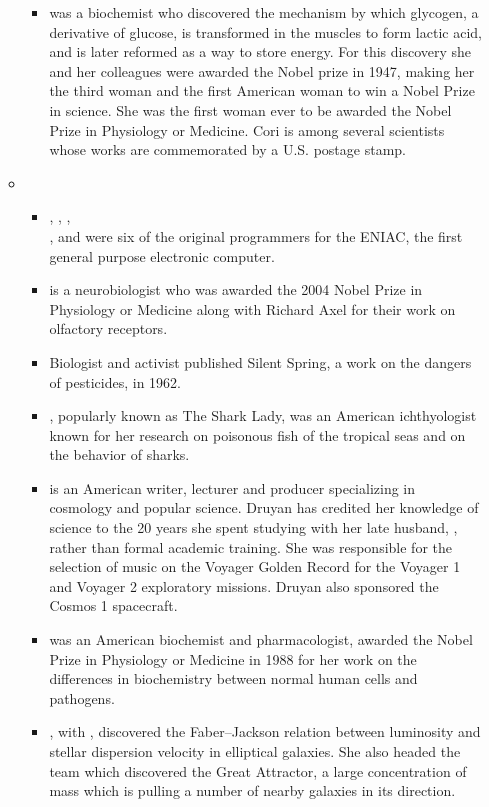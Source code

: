\documentclass[12pt,a4paper]{article}
\begin{document}
\begin{enumerate}
\begin{itemize}
\begin{itemize}
        \item {} was a biochemist who discovered the mechanism by which glycogen, a derivative of glucose, is transformed in the muscles to form lactic acid, and is later reformed as a way to store energy. For this discovery she and her colleagues were awarded the Nobel prize in 1947, making her the third woman and the first American woman to win a Nobel Prize in science. She was the first woman ever to be awarded the Nobel Prize in Physiology or Medicine. Cori is among several scientists whose works are commemorated by a U.S. postage stamp.
      \end{itemize}
      \item {}
      \begin{itemize}
        \item {}, , ,\\ ,  and  were six of the original programmers for the ENIAC, the first general purpose electronic computer.
        \item {} is a neurobiologist who was awarded the 2004 Nobel Prize in Physiology or Medicine along with Richard Axel for their work on olfactory receptors.
        \item Biologist and activist  published Silent Spring, a work on the dangers of pesticides, in 1962.
        \item {}, popularly known as The Shark Lady, was an American ichthyologist known for her research on poisonous fish of the tropical seas and on the behavior of sharks.
        \item {} is an American writer, lecturer and producer specializing in cosmology and popular science. Druyan has credited her knowledge of science to the 20 years she spent studying with her late husband, , rather than formal academic training. She was responsible for the selection of music on the Voyager Golden Record for the Voyager 1 and Voyager 2 exploratory missions. Druyan also sponsored the Cosmos 1 spacecraft.
        \item {} was an American biochemist and pharmacologist, awarded the Nobel Prize in Physiology or Medicine in 1988 for her work on the differences in biochemistry between normal human cells and pathogens.
        \item {}, with , discovered the Faber–Jackson relation between luminosity and stellar dispersion velocity in elliptical galaxies. She also headed the team which discovered the Great Attractor, a large concentration of mass which is pulling a number of nearby galaxies in its direction.

\end{itemize}
\end{itemize}
\end{enumerate}
\end{document}
